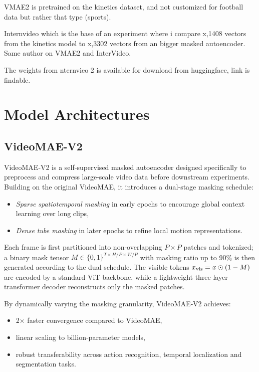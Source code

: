 VMAE2 is pretrained on the kinetics dataset, and not customized for football data but rather that type (sports). 

Internvideo which is the base of an experiment where i compare x,1408 vectors from the kinetics model to x,3302 vectors from an bigger masked autoencoder. Same author on VMAE2 and InterVideo. 

The weights from nternvieo 2 is available for download from huggingface, link is findable. 

\section{Model Architectures}
\label{sec:model_architectures}

\subsection{VideoMAE-V2}
\label{ssec:videomae_v2}

VideoMAE‑V2 \cite{wang_videomae_2023} is a self‑supervised masked autoencoder designed specifically to preprocess and compress large‑scale video data before downstream experiments. Building on the original VideoMAE, it introduces a dual‑stage masking schedule: 

\begin{itemize}
    \item \emph{Sparse spatiotemporal masking} in early epochs to encourage global context learning over long clips,
    \item \emph{Dense tube masking} in later epochs to refine local motion representations.
\end{itemize}
Each frame is first partitioned into non‑overlapping $P\times P$ patches and tokenized; a binary mask tensor $M\in\{0,1\}^{T\times H/P\times W/P}$ with masking ratio up to 90\% is then generated according to the dual schedule. The visible tokens $x_{\rm vis}=x\odot(1-M)$ are encoded by a standard ViT backbone, while a lightweight three‑layer transformer decoder reconstructs only the masked patches. 

By dynamically varying the masking granularity, VideoMAE‑V2 achieves:
\begin{itemize}
    \item 2× faster convergence compared to VideoMAE,
    \item linear scaling to billion‑parameter models,
    \item robust transferability across action recognition, temporal localization and segmentation tasks.
\end{itemize}

